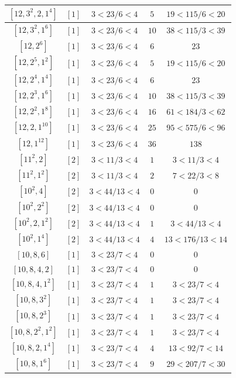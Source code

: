 \documentclass{article}%
\begin{document}
\begin{center}
\begin{longtable}{||c|c|c|c|c||}
$[12, 3^{2}, 2, 1^{4}]$ & $[1]$ & $3 < 23/6 < 4$ & $5$ & $19 < 115/6 < 20$ \\ \hline 
$[12, 3^{2}, 1^{6}]$ & $[1]$ & $3 < 23/6 < 4$ & $10$ & $38 < 115/3 < 39$ \\ \hline 
$[12, 2^{6}]$ & $[1]$ & $3 < 23/6 < 4$ & $6$ & $23$ \\ \hline 
$[12, 2^{5}, 1^{2}]$ & $[1]$ & $3 < 23/6 < 4$ & $5$ & $19 < 115/6 < 20$ \\ \hline 
$[12, 2^{4}, 1^{4}]$ & $[1]$ & $3 < 23/6 < 4$ & $6$ & $23$ \\ \hline 
$[12, 2^{3}, 1^{6}]$ & $[1]$ & $3 < 23/6 < 4$ & $10$ & $38 < 115/3 < 39$ \\ \hline 
$[12, 2^{2}, 1^{8}]$ & $[1]$ & $3 < 23/6 < 4$ & $16$ & $61 < 184/3 < 62$ \\ \hline 
$[12, 2, 1^{10}]$ & $[1]$ & $3 < 23/6 < 4$ & $25$ & $95 < 575/6 < 96$ \\ \hline 
$[12, 1^{12}]$ & $[1]$ & $3 < 23/6 < 4$ & $36$ & $138$ \\ \hline 
$[11^{2}, 2]$ & $[2]$ & $3 < 11/3 < 4$ & $1$ & $3 < 11/3 < 4$ \\ \hline 
$[11^{2}, 1^{2}]$ & $[2]$ & $3 < 11/3 < 4$ & $2$ & $7 < 22/3 < 8$ \\ \hline 
$[10^{2}, 4]$ & $[2]$ & $3 < 44/13 < 4$ & $0$ & $0$ \\ \hline 
$[10^{2}, 2^{2}]$ & $[2]$ & $3 < 44/13 < 4$ & $0$ & $0$ \\ \hline 
$[10^{2}, 2, 1^{2}]$ & $[2]$ & $3 < 44/13 < 4$ & $1$ & $3 < 44/13 < 4$ \\ \hline 
$[10^{2}, 1^{4}]$ & $[2]$ & $3 < 44/13 < 4$ & $4$ & $13 < 176/13 < 14$ \\ \hline 
$[10, 8, 6]$ & $[1]$ & $3 < 23/7 < 4$ & $0$ & $0$ \\ \hline 
$[10, 8, 4, 2]$ & $[1]$ & $3 < 23/7 < 4$ & $0$ & $0$ \\ \hline 
$[10, 8, 4, 1^{2}]$ & $[1]$ & $3 < 23/7 < 4$ & $1$ & $3 < 23/7 < 4$ \\ \hline 
$[10, 8, 3^{2}]$ & $[1]$ & $3 < 23/7 < 4$ & $1$ & $3 < 23/7 < 4$ \\ \hline 
$[10, 8, 2^{3}]$ & $[1]$ & $3 < 23/7 < 4$ & $1$ & $3 < 23/7 < 4$ \\ \hline 
$[10, 8, 2^{2}, 1^{2}]$ & $[1]$ & $3 < 23/7 < 4$ & $1$ & $3 < 23/7 < 4$ \\ \hline 
$[10, 8, 2, 1^{4}]$ & $[1]$ & $3 < 23/7 < 4$ & $4$ & $13 < 92/7 < 14$ \\ \hline 
$[10, 8, 1^{6}]$ & $[1]$ & $3 < 23/7 < 4$ & $9$ & $29 < 207/7 < 30$ \\ \hline 

\end{longtable}
\end{center}
\end{document}
